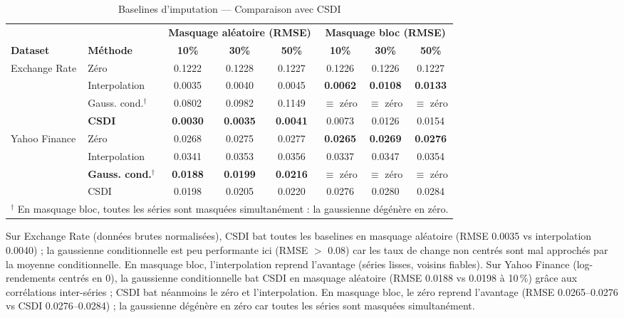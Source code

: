 \documentclass[12pt,a4paper]{article}
\newcounter{rmqctr}[section]
\renewcommand{\thermqctr}{\thesection.\arabic{rmqctr}}
\newenvironment{remarque}[1][]
  {\refstepcounter{rmqctr}\begin{tcolorbox}[rmqstyle,title={Remarque~\thermqctr\if\relax\detokenize{#1}\relax\else~--- #1\fi}]}
  {\end{tcolorbox}}
\begin{document}
\begin{table}[H]
\centering
\caption{Baselines d'imputation --- Comparaison avec CSDI}
\label{tab:imputation_baselines}
\begin{tabular}{llcccccc}
\toprule
 & & \multicolumn{3}{c}{\textbf{Masquage al\'eatoire (RMSE)}} & \multicolumn{3}{c}{\textbf{Masquage bloc (RMSE)}} \\
\cmidrule(lr){3-5} \cmidrule(lr){6-8}
\textbf{Dataset} & \textbf{M\'ethode} & \textbf{10\%} & \textbf{30\%} & \textbf{50\%} & \textbf{10\%} & \textbf{30\%} & \textbf{50\%} \\
\midrule
\multirow{4}{*}{Exchange Rate}
  & Z\'ero & 0.1222 & 0.1228 & 0.1227 & 0.1226 & 0.1226 & 0.1227 \\
  & Interpolation & 0.0035 & 0.0040 & 0.0045 & \textbf{0.0062} & \textbf{0.0108} & \textbf{0.0133} \\
  & Gauss. cond.$^\dagger$ & 0.0802 & 0.0982 & 0.1149 & $\equiv$ z\'ero & $\equiv$ z\'ero & $\equiv$ z\'ero \\
  & \textbf{CSDI} & \textbf{0.0030} & \textbf{0.0035} & \textbf{0.0041} & 0.0073 & 0.0126 & 0.0154 \\
\midrule
\multirow{4}{*}{Yahoo Finance}
  & Z\'ero & 0.0268 & 0.0275 & 0.0277 & \textbf{0.0265} & \textbf{0.0269} & \textbf{0.0276} \\
  & Interpolation & 0.0341 & 0.0353 & 0.0356 & 0.0337 & 0.0347 & 0.0354 \\
  & \textbf{Gauss. cond.}$^\dagger$ & \textbf{0.0188} & \textbf{0.0199} & \textbf{0.0216} & $\equiv$ z\'ero & $\equiv$ z\'ero & $\equiv$ z\'ero \\
  & CSDI & 0.0198 & 0.0205 & 0.0220 & 0.0276 & 0.0280 & 0.0284 \\
\bottomrule
\multicolumn{8}{l}{\footnotesize $^\dagger$ En masquage bloc, toutes les s\'eries sont masqu\'ees simultan\'ement : la gaussienne d\'eg\'en\`ere en z\'ero.}
\end{tabular}
\end{table}

\begin{remarque}[Interpr\'etation des baselines]
Sur Exchange Rate (donn\'ees brutes normalis\'ees), CSDI bat toutes les baselines en masquage al\'eatoire (RMSE 0.0035 vs interpolation 0.0040) ; la gaussienne conditionnelle est peu performante ici (RMSE $>$ 0.08) car les taux de change non centr\'es sont mal approch\'es par la moyenne conditionnelle. En masquage bloc, l'interpolation reprend l'avantage (s\'eries lisses, voisins fiables). Sur Yahoo Finance (log-rendements centr\'es en 0), la gaussienne conditionnelle bat CSDI en masquage al\'eatoire (RMSE 0.0188 vs 0.0198 \`a 10\,\%) gr\^ace aux corr\'elations inter-s\'eries ; CSDI bat n\'eanmoins le z\'ero et l'interpolation. En masquage bloc, le z\'ero reprend l'avantage (RMSE 0.0265--0.0276 vs CSDI 0.0276--0.0284) ; la gaussienne d\'eg\'en\`ere en z\'ero car toutes les s\'eries sont masqu\'ees simultan\'ement.
\end{remarque}
\end{document}
